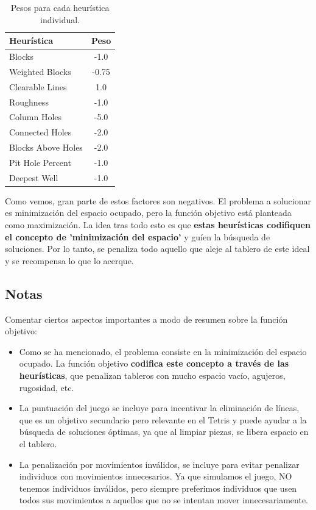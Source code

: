 \documentclass[11pt,spanish,listoffigures,listoftables]{tfgetsinf}
\begin{document}
\begin{table}[H]
    \centering
    \caption{Pesos para cada heurística individual.}
    \label{tab:pesos_heuristicas}
    \begin{tabular}{lc}
        \toprule
        \textbf{Heurística} & \textbf{Peso} \\
        \midrule
        Blocks & -1.0 \\
        Weighted Blocks & -0.75 \\
        Clearable Lines & 1.0 \\
        Roughness & -1.0 \\
        Column Holes & -5.0 \\
        Connected Holes & -2.0 \\
        Blocks Above Holes & -2.0 \\
        Pit Hole Percent & -1.0 \\
        Deepest Well & -1.0 \\
        \bottomrule
    \end{tabular}
\end{table}

Como vemos, gran parte de estos factores son negativos. El problema a solucionar es minimización del espacio ocupado, pero la función objetivo está planteada como maximización. La idea tras todo esto es que \textbf{estas heurísticas codifiquen el concepto de 'minimización del espacio'} y guíen la búsqueda de soluciones. Por lo tanto, se penaliza todo aquello que aleje al tablero de este ideal y se recompensa lo que lo acerque.

\subsection{Notas}
Comentar ciertos aspectos importantes a modo de resumen sobre la función objetivo:
\begin{itemize}
    \item Como se ha mencionado, el problema consiste en la minimización del espacio ocupado. La función objetivo \textbf{codifica este concepto a través de las heurísticas}, que penalizan tableros con mucho espacio vacío, agujeros, rugosidad, etc.
    \item La puntuación del juego se incluye para incentivar la eliminación de líneas, que es un objetivo secundario pero relevante en el Tetris y puede ayudar a la búsqueda de soluciones óptimas, ya que al limpiar piezas, se libera espacio en el tablero.
    \item La penalización por movimientos inválidos, se incluye para evitar penalizar individuos con movimientos innecesarios. Ya que simulamos el juego, NO tenemos individuos inválidos, pero siempre preferimos individuos que usen todos sus movimientos a aquellos que no se intentan mover innecesariamente.
\end{itemize}
\end{document}
